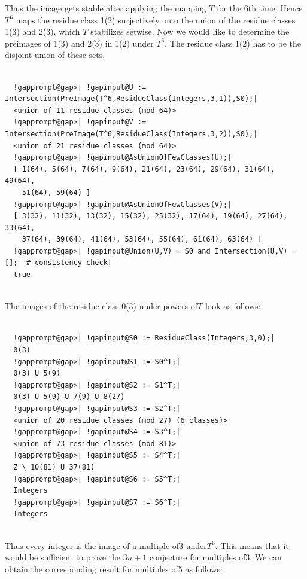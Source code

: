 \documentclass[a4paper,11pt]{report}
\begin{document}
{{\begin{Verbatim}[commandchars=!@|,fontsize=\small,frame=single,label=Example]
\end{Verbatim}
 Thus the image gets stable after applying the mapping $T$ for the 6th time. Hence $T^6$ maps the residue class 1(2) surjectively onto the union of the residue classes
1(3) and 2(3), which $T$ stabilizes setwise. Now we would like to determine the preimages of 1(3) and
2(3) in 1(2) under $T^6$. The residue class 1(2) has to be the disjoint union of these sets. 
\begin{Verbatim}[commandchars=!@|,fontsize=\small,frame=single,label=Example]
  
  !gapprompt@gap>| !gapinput@U := Intersection(PreImage(T^6,ResidueClass(Integers,3,1)),S0);|
  <union of 11 residue classes (mod 64)>
  !gapprompt@gap>| !gapinput@V := Intersection(PreImage(T^6,ResidueClass(Integers,3,2)),S0);|
  <union of 21 residue classes (mod 64)>
  !gapprompt@gap>| !gapinput@AsUnionOfFewClasses(U);|
  [ 1(64), 5(64), 7(64), 9(64), 21(64), 23(64), 29(64), 31(64), 49(64), 
    51(64), 59(64) ]
  !gapprompt@gap>| !gapinput@AsUnionOfFewClasses(V);|
  [ 3(32), 11(32), 13(32), 15(32), 25(32), 17(64), 19(64), 27(64), 33(64), 
    37(64), 39(64), 41(64), 53(64), 55(64), 61(64), 63(64) ]
  !gapprompt@gap>| !gapinput@Union(U,V) = S0 and Intersection(U,V) = [];  # consistency check|
  true
  
\end{Verbatim}
 The images of the residue class 0(3) under powers of{\nobreakspace}$T$ look as follows: 
\begin{Verbatim}[commandchars=!@|,fontsize=\small,frame=single,label=Example]
  
  !gapprompt@gap>| !gapinput@S0 := ResidueClass(Integers,3,0);|
  0(3)
  !gapprompt@gap>| !gapinput@S1 := S0^T;|
  0(3) U 5(9)
  !gapprompt@gap>| !gapinput@S2 := S1^T;|
  0(3) U 5(9) U 7(9) U 8(27)
  !gapprompt@gap>| !gapinput@S3 := S2^T;|
  <union of 20 residue classes (mod 27) (6 classes)>
  !gapprompt@gap>| !gapinput@S4 := S3^T;|
  <union of 73 residue classes (mod 81)>
  !gapprompt@gap>| !gapinput@S5 := S4^T;|
  Z \ 10(81) U 37(81)
  !gapprompt@gap>| !gapinput@S6 := S5^T;|
  Integers
  !gapprompt@gap>| !gapinput@S7 := S6^T;|
  Integers
  
\end{Verbatim}
 Thus every integer is the image of a multiple of{\nobreakspace}3
under{\nobreakspace}$T^6$. This means that it would be sufficient to prove the $3n+1$ conjecture for multiples of{\nobreakspace}3. We can obtain the corresponding
result for multiples of{\nobreakspace}5 as follows: 
\begin{Verbatim}[commandchars=!@|,fontsize=\small,frame=single,label=Example]
  

\end{Verbatim}}}
\end{document}
